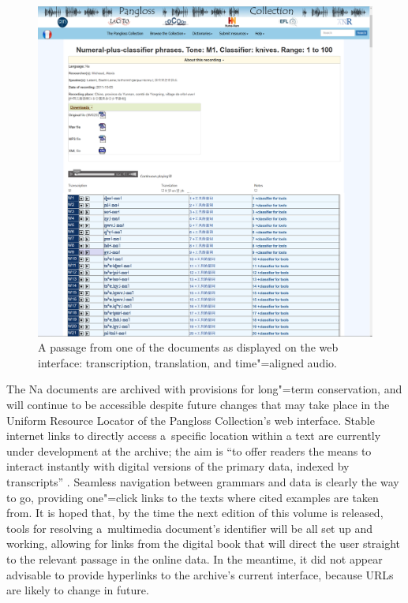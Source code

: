 \begin{figure}[t] 
\includegraphics[width=\textwidth]{figures/SampleDisplay.png}
\caption{A passage from one of the documents as displayed on the web interface: transcription, translation, and time"=aligned audio.}
\label{fig:apassagefromoneofthedocumentsasdisplayedonthewebinterface}
\end{figure}



The Na documents are archived with provisions for long"=term conservation, and will continue to be accessible despite future changes
that may take place in the Uniform Resource Locator of the Pangloss Collection’s web interface. Stable internet links to directly access a~specific location within a
text are currently under development at the archive; the aim is “to offer readers the means to interact instantly with digital versions of the primary data, indexed by transcripts'' \citep{thieberger2009}. Seamless navigation between grammars and data is clearly the way to go, providing one"=click links to the texts where cited examples are taken from. It is hoped that, by the time the next edition of this volume is released, tools for resolving a~multimedia document's identifier will be all set up and working, allowing for links from the digital book that will direct the user straight to the relevant passage in the online data. In the meantime, it did not
appear advisable to provide hyperlinks to the archive's current interface, because URLs are likely to
change in future.

